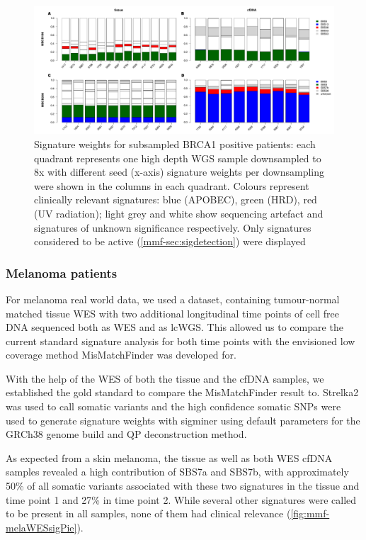  
\begin{figure}[ht]
\centering
\includegraphics[width=.99\linewidth]{Figures/MisMatchFinder/brca1BarPlots.pdf}
\caption[Signature weights for subsampled BRCA1 positive patients]{Signature weights for subsampled BRCA1 positive patients: each quadrant represents one high depth WGS sample downsampled to 8x with different seed (x-axis) signature weights per downsampling were shown in the columns in each quadrant. Colours represent clinically relevant signatures: blue (APOBEC), green (HRD), red (UV radiation); light grey and white show sequencing artefact and signatures of unknown significance respectively. Only signatures considered to be active (\autoref{mmf-sec:sigdetection}) were displayed}\label{fig:mmf-mbcbBarPlot}
\end{figure}

\subsubsection{Melanoma patients}
\label{mmf-sec:melpatients}

For melanoma real world data, we used a dataset, containing tumour-normal matched tissue WES with two additional longitudinal time points of cell free DNA sequenced both as WES and as lcWGS. This allowed us to compare the current standard signature analysis for both time points with the envisioned low coverage method MisMatchFinder was developed for.

With the help of the WES of both the tissue and the cfDNA samples, we established the gold standard to compare the MisMatchFinder result to.  Strelka2 was used to call somatic variants and the high confidence somatic SNPs were used to generate signature weights with sigminer \cite{Wang2021} using default parameters for the GRCh38 genome build and QP deconstruction method.

As expected from a skin melanoma, the tissue as well as both WES cfDNA samples revealed a high contribution of SBS7a and SBS7b, with approximately 50\%  of all somatic variants associated with these two signatures in the tissue and time point 1 and 27\% in time point 2. While several other signatures were called to be present in all samples, none of them had clinical relevance (\autoref{fig:mmf-melaWESsigPie}).

